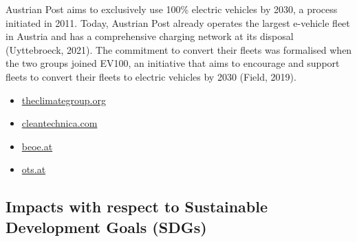 \documentclass[
]{book}
\providecommand{\tightlist}{%
  \setlength{\itemsep}{0pt}\setlength{\parskip}{0pt}}
\begin{document}
Austrian Post aims to exclusively use 100\% electric vehicles by 2030, a process initiated in 2011. Today, Austrian Post already operates the largest e-vehicle fleet in Austria and has a comprehensive charging network at its disposal (Uyttebroeck, 2021). The commitment to convert their fleets was formalised when the two groups joined EV100, an initiative that aims to encourage and support fleets to convert their fleets to electric vehicles by 2030 (Field, 2019).

\begin{itemize}
\tightlist
\item
  \href{https://www.theclimategroup.org/ev100}{theclimategroup.org}
\item
  \href{https://cleantechnica.com/2019/04/27/the-swiss-austrian-post-announce-commitment-to-100-evs-by-2030/}{cleantechnica.com}
\item
  \href{https://www.beoe.at/about-us/}{beoe.at}
\item
  \href{https://www.ots.at/pressemappe/17440/bundesverband-elektromobilitaet-oesterreich-beoe}{ots.at}
\end{itemize}

\hypertarget{impacts-with-respect-to-sustainable-development-goals-sdgs-34}{%
\subsection*{Impacts with respect to Sustainable Development Goals (SDGs)}\label{impacts-with-respect-to-sustainable-development-goals-sdgs-34}}
\end{document}
